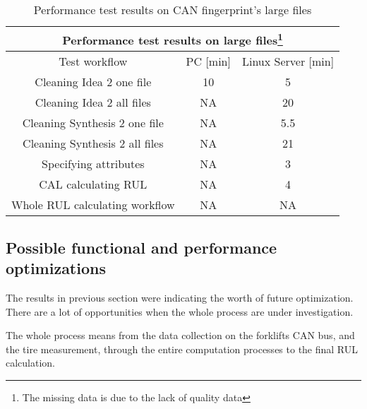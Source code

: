 \begin{table}[H]
\centering
\begin{tabular}{ |c|c|c|  }
\hline
\multicolumn{3}{|c|}{Performance test results on large files\footnote{The missing data is due to the lack of quality data}} \\
\hline
Test workflow& PC [min] & Linux Server [min]\\
\hline
Cleaning Idea 2 one file& 10 & 5 \\
Cleaning Idea 2 all files& NA & 20 \\
Cleaning Synthesis 2 one file& NA & 5.5 \\
Cleaning Synthesis 2 all files& NA & 21 \\
Specifying attributes & NA & 3 \\
CAL calculating RUL & NA & 4 \\
Whole RUL calculating workflow & NA & NA \\
\hline
\end{tabular}
\caption{Performance test results on CAN fingerprint's large files}
\label{table:2}
\end{table}
\subsection{Possible functional and performance optimizations}
The results in previous section were indicating the worth of future optimization. There are a lot of opportunities when the whole process are under investigation.

The whole process means from the data collection on the forklifts CAN bus, and the tire measurement, through the entire computation processes to the final RUL calculation.

